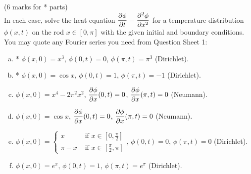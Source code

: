 \documentclass[12pt]{article}
\begin{document}
\begin{question}(6 marks for * parts)\\
In each case, solve the heat equation $\dfrac{\partial \phi}{\partial t}=\dfrac{\partial^2 \phi}{\partial x^2}$ for a temperature distribution $\phi(x,t)$ on the rod $x\in[0,\pi]$ with the given initial and boundary conditions. You may quote any Fourier series you need from Question Sheet 1:
\begin{enumerate}[(a)]
\item * $\phi(x,0)=x^3$, $\phi(0,t)=0$, $\phi(\pi,t)=\pi^3$ (Dirichlet).
\item * $\phi(x,0)=\cos x$, $\phi(0,t)=1$, $\phi(\pi,t)=-1$ (Dirichlet).
\item $\phi(x,0)=x^4-2\pi^2 x^2$, $\dfrac{\partial \phi}{\partial x}(0,t)=0$, $\dfrac{\partial \phi}{\partial x}(\pi,t)=0$ (Neumann).
\item $\phi(x,0)=\cos x$, $\dfrac{\partial \phi}{\partial x}(0,t)=0$, $\dfrac{\partial \phi}{\partial x}(\pi,t)=0$ (Neumann).
\item $\phi(x,0)=\begin{cases}x&\mbox{ if }x\in\left[0,\tfrac{\pi}{2}\right]\\ \pi-x&\mbox{ if }x\in\left[\tfrac{\pi}{2},\pi\right]\end{cases}$, $\phi(0,t)=0$, $\phi(\pi,t)=0$ (Dirichlet).
\item $\phi(x,0)=e^x$, $\phi(0,t)=1$, $\phi(\pi,t)=e^{\pi}$ (Dirichlet).
\end{enumerate}
\end{question}
\end{document}
